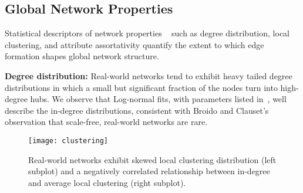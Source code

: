 %

\subsection{Global Network Properties}
\label{subsec:factors}

Statistical descriptors of network properties ~\cite{newman2010networks}
such as degree distribution, local clustering, and attribute assortativity
quantify the extent to which edge formation shapes global network
structure.

\textbf{Degree distribution:}
Real-world networks tend to exhibit heavy tailed degree distributions in which
a small but significant fraction of the nodes turn into high-degree hubs.
We observe that Log-normal fits, with parameters listed in~, well describe
the in-degree distributions, consistent with Broido and
Clauset's~\cite{broido2018scale} observation that scale-free, real-world networks
are rare.

\begin{figure}
 \centering
 \texttt{[image: clustering]}
 \caption{
    Real-world networks exhibit
    skewed local clustering distribution (left subplot) and a negatively correlated
    relationship between in-degree and average local clustering (right subplot).
 }
 \label{fig:cc_dc}
\end{figure}

